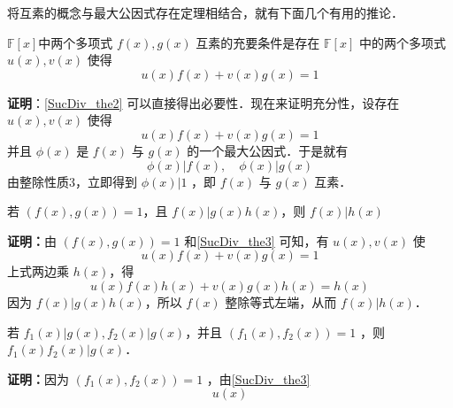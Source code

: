 将互素的概念与最大公因式存在定理相结合，就有下面几个有用的推论．
\begin{theorem}{}\label{SucDiv_the3}
$\mathbb{F}[x]$中两个多项式 $f(x),g(x)$ 互素的充要条件是存在 $\mathbb{F}[x]$ 中的两个多项式 $u(x),v(x)$ 使得
\begin{equation}
u(x)f(x)+v(x)g(x)=1
\end{equation}
\end{theorem}
\textbf{证明}：\autoref{SucDiv_the2} 可以直接得出必要性．现在来证明充分性，设存在 $u(x),v(x)$ 使得 
\begin{equation}
u(x)f(x)+v(x)g(x)=1
\end{equation}
并且 $\phi(x)$ 是 $f(x)$ 与 $g(x)$ 的一个最大公因式．于是就有
\begin{equation}
\phi(x)|f(x),\quad \phi(x)|g(x)
\end{equation}
由整除性质3，立即得到 $\phi(x)|1$ ，即 $f(x)$ 与 $g(x)$ 互素．
\begin{theorem}{}
若 $(f(x),g(x))=1$，且 $f(x)|g(x)h(x)$，则 $f(x)|h(x)$
\end{theorem}
\textbf{证明：}由 $(f(x),g(x))=1$ 和\autoref{SucDiv_the3} 可知，有 $u(x),v(x)$ 使
\begin{equation}
u(x)f(x)+v(x)g(x)=1
\end{equation}
上式两边乘 $h(x)$，得
\begin{equation}
u(x)f(x)h(x)+v(x)g(x)h(x)=h(x)
\end{equation}
因为 $f(x)|g(x)h(x)$，所以 $f(x)$ 整除等式左端，从而 $f(x)|h(x)$．
\begin{theorem}{}
若 $f_1(x)|g(x),f_2(x)|g(x)$，并且 $(f_1(x),f_2(x))=1$ ，则 $f_1(x)f_2(x)|g(x)$．
\end{theorem}
\textbf{证明：}因为 $(f_1(x),f_2(x))=1$ ，由\autoref{SucDiv_the3} 
\begin{equation}
u(x)
\end{equation}
